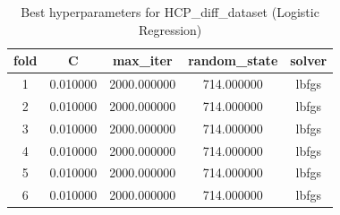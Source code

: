\begin{table}[htbp]
\caption{Best hyperparameters for HCP_diff_dataset (Logistic Regression)}
\label{tab:best_hyperparams_HCP_diff_dataset}
\begin{tabular}{ccccc}
\toprule
fold & C & max_iter & random_state & solver \\
\midrule
1 & 0.010000 & 2000.000000 & 714.000000 & lbfgs \\
2 & 0.010000 & 2000.000000 & 714.000000 & lbfgs \\
3 & 0.010000 & 2000.000000 & 714.000000 & lbfgs \\
4 & 0.010000 & 2000.000000 & 714.000000 & lbfgs \\
5 & 0.010000 & 2000.000000 & 714.000000 & lbfgs \\
6 & 0.010000 & 2000.000000 & 714.000000 & lbfgs \\
\bottomrule
\end{tabular}
\end{table}
